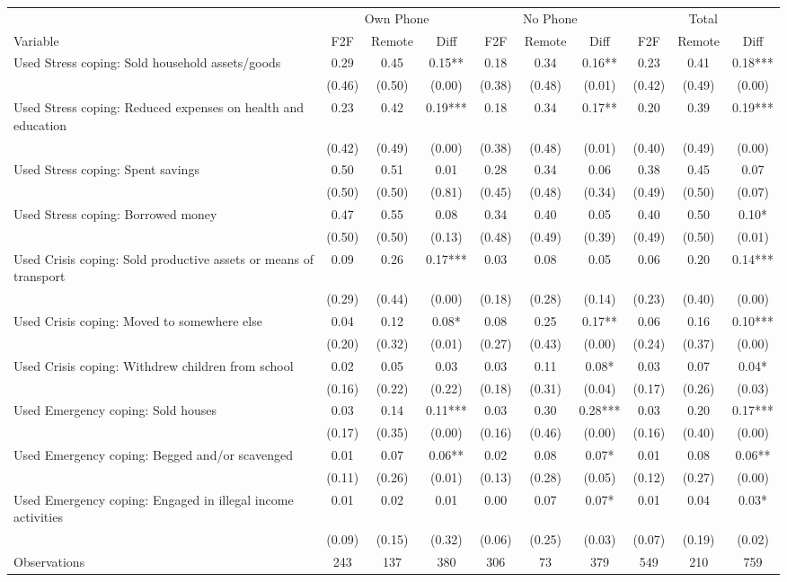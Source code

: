 \begin{tabular}{l*{9}c}
\hline\hline
 & \multicolumn{3}{c}{Own Phone} & \multicolumn{3}{c}{No Phone} & \multicolumn{3}{c}{Total}\\ 
Variable & F2F & Remote & Diff & F2F & Remote & Diff & F2F & Remote & Diff \\
\hline
Used Stress coping: Sold household assets/goods&0.29&0.45&0.15**&0.18&0.34&0.16**&0.23&0.41&0.18***\\
&(0.46)&(0.50)&(0.00)&(0.38)&(0.48)&(0.01)&(0.42)&(0.49)&(0.00)\\
Used Stress coping: Reduced expenses on health and education&0.23&0.42&0.19***&0.18&0.34&0.17**&0.20&0.39&0.19***\\
&(0.42)&(0.49)&(0.00)&(0.38)&(0.48)&(0.01)&(0.40)&(0.49)&(0.00)\\
Used Stress coping: Spent savings&0.50&0.51&0.01&0.28&0.34&0.06&0.38&0.45&0.07\\
&(0.50)&(0.50)&(0.81)&(0.45)&(0.48)&(0.34)&(0.49)&(0.50)&(0.07)\\
Used Stress coping: Borrowed money&0.47&0.55&0.08&0.34&0.40&0.05&0.40&0.50&0.10*\\
&(0.50)&(0.50)&(0.13)&(0.48)&(0.49)&(0.39)&(0.49)&(0.50)&(0.01)\\
Used Crisis coping: Sold productive assets or means of transport&0.09&0.26&0.17***&0.03&0.08&0.05&0.06&0.20&0.14***\\
&(0.29)&(0.44)&(0.00)&(0.18)&(0.28)&(0.14)&(0.23)&(0.40)&(0.00)\\
Used Crisis coping: Moved to somewhere else&0.04&0.12&0.08*&0.08&0.25&0.17**&0.06&0.16&0.10***\\
&(0.20)&(0.32)&(0.01)&(0.27)&(0.43)&(0.00)&(0.24)&(0.37)&(0.00)\\
Used Crisis coping: Withdrew children from school&0.02&0.05&0.03&0.03&0.11&0.08*&0.03&0.07&0.04*\\
&(0.16)&(0.22)&(0.22)&(0.18)&(0.31)&(0.04)&(0.17)&(0.26)&(0.03)\\
Used Emergency coping: Sold houses&0.03&0.14&0.11***&0.03&0.30&0.28***&0.03&0.20&0.17***\\
&(0.17)&(0.35)&(0.00)&(0.16)&(0.46)&(0.00)&(0.16)&(0.40)&(0.00)\\
Used Emergency coping: Begged and/or scavenged&0.01&0.07&0.06**&0.02&0.08&0.07*&0.01&0.08&0.06**\\
&(0.11)&(0.26)&(0.01)&(0.13)&(0.28)&(0.05)&(0.12)&(0.27)&(0.00)\\
Used Emergency coping: Engaged in illegal income activities&0.01&0.02&0.01&0.00&0.07&0.07*&0.01&0.04&0.03*\\
&(0.09)&(0.15)&(0.32)&(0.06)&(0.25)&(0.03)&(0.07)&(0.19)&(0.02)\\
\hline
Observations & 243 & 137 & 380 & 306 & 73 & 379 & 549 & 210 & 759 \\
\hline\hline
\end{tabular}
